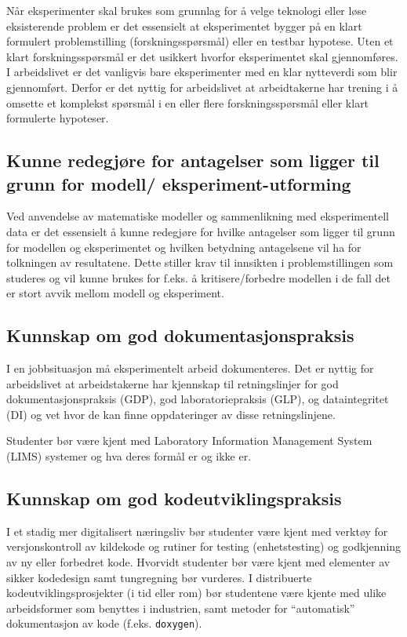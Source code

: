 \documentclass{article}
\begin{document}
Når eksperimenter skal brukes som grunnlag for å velge teknologi eller løse eksisterende problem er det essensielt at eksperimentet bygger på en klart formulert problemstilling (forskningsspørsmål) eller en testbar hypotese. Uten et klart forskningsspørsmål er det usikkert hvorfor eksperimentet skal gjennomføres. I arbeidslivet er det vanligvis bare eksperimenter med en klar nytteverdi som blir gjennomført. Derfor er det nyttig for arbeidslivet at arbeidtakerne har trening i å omsette et komplekst spørsmål i en eller flere forskningsspørsmål eller klart formulerte hypoteser.

\subsection{Kunne redegjøre for antagelser som ligger til grunn for modell/ eksperiment-utforming}
Ved anvendelse av matematiske modeller og sammenlikning med eksperimentell data er det essensielt å kunne redegjøre for hvilke antagelser som ligger til grunn for modellen og eksperimentet og hvilken betydning antagelsene vil ha for tolkningen av resultatene.
Dette stiller krav til innsikten i problemstillingen som studeres og vil kunne brukes for f.eks. å kritisere/forbedre modellen i de fall det er stort avvik mellom modell og eksperiment.

\subsection{Kunnskap om god dokumentasjonspraksis}
I en jobbsituasjon må eksperimentelt arbeid dokumenteres. Det er nyttig for arbeidslivet at arbeidstakerne har kjennskap til retningslinjer for god dokumentasjonspraksis (GDP), god laboratoriepraksis (GLP), og dataintegritet (DI) og vet hvor de kan finne oppdateringer av disse retningslinjene.

Studenter bør være kjent med Laboratory Information Management System (LIMS) systemer og hva deres formål er og ikke er. 

\subsection{Kunnskap om god kodeutviklingspraksis}
I et stadig mer digitalisert næringsliv bør studenter være kjent med verktøy for versjonskontroll av kildekode og rutiner for testing (enhetstesting) og godkjenning av ny eller forbedret kode. Hvorvidt studenter bør være kjent med elementer av sikker kodedesign samt tungregning bør vurderes. I distribuerte kodeutviklingsprosjekter (i tid eller rom) bør studentene være kjente med ulike  arbeidsformer som benyttes i industrien, samt metoder for ``automatisk'' dokumentasjon av kode (f.eks. \verb+doxygen+).
\end{document}
